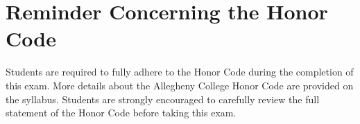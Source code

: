 \vspace*{-.15in}
\section*{Reminder Concerning the Honor Code}

\noindent Students are required to fully adhere to the Honor Code during the completion of this exam. More details about
the Allegheny College Honor Code are provided on the syllabus. Students are strongly encouraged to carefully review the
full statement of the Honor Code before taking this exam.






